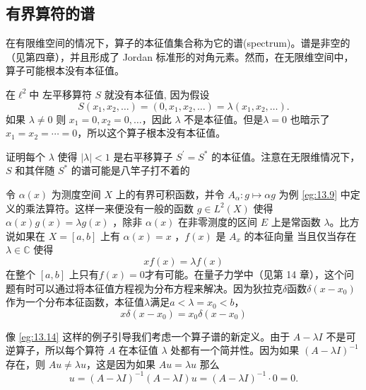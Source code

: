 \subsection{有界算符的谱}
在有限维空间的情况下，算子的本征值集合称为它的谱(spectrum)。谱是非空的（见第四章），并且形成了 Jordan 标准形的对角元素。然而，在无限维空间中，算子可能根本没有本征值。
\begin{eg}
在\(\ell^{2}\)中 左平移算符 \(S\) 就没有本征值, 因为假设
\[
S\left(x_{1}, x_{2}, \ldots\right)=\left(0, x_{1}, x_{2}, \ldots\right)=\lambda\left(x_{1}, x_{2}, \ldots\right) .
\]
如果 \(\lambda \neq 0\) 则 \(x_{1}=0, x_{2}=0, \ldots\)，因此 \(\lambda\) 不是本征值。但是\(\lambda=0\) 也暗示了\(x_{1}=x_{2}=\cdots=0\)，所以这个算子根本没有本征值。
\end{eg}
\begin{exercise}
    证明每个 \(\lambda\) 使得 \(|\lambda|<1\) 是右平移算子 \(S^{\prime}=S^{*}\) 的本征值。注意在无限维情况下，\(S\) 和其伴随 \(S^{*}\) 的谱可能是八竿子打不着的
\end{exercise}
\begin{eg}\label{eg:13.14}
   令 \(\alpha(x)\) 为测度空间 \(X\) 上的有界可积函数，并令 \(A_{\alpha}: g \mapsto \alpha g\) 为例 \ref{eg:13.9} 中定义的乘法算符。这样一来便没有一般的函数 \(g \in L^{2}(X)\) 使得 \(\alpha(x) g(x)=\lambda g(x)\) ，除非 \(\alpha(x) \) 在非零测度的区间 \(E\) 上是常函数 \(\lambda\)。比方说如果在 \(X=[a, b]\) 上有 \(\alpha(x)=x\) ，\(f(x)\) 是 \(A_{x}\) 的本征向量 当且仅当存在 \(\lambda \in \mathbb{C}\) 使得
\[
x f(x)=\lambda f(x)
\]
在整个 \([a, b]\) 上只有\(f(x)=0\)才有可能。在量子力学中（见第 14 章），这个问题有时可以通过将本征值方程视为分布方程来解决。因为狄拉克\(\delta\)函数\(\delta\left(x-x_{0}\right)\)作为一个分布本征函数，本征值\(\lambda\)满足\(a<\lambda=x_{0}<b\)，
\[
x \delta\left(x-x_{0}\right)=x_{0} \delta\left(x-x_{0}\right)
\]
\end{eg}

像 \ref{eg:13.14} 这样的例子引导我们考虑一个算子谱的新定义。由于 \(A-\lambda I\) 不是可逆算子，所以每个算符 \(A\) 在本征值 \(\lambda\) 处都有一个简并性。因为如果 \((A-\lambda I)^{-1}\) 存在，则 \(A u \neq \lambda u\)，这是因为如果 \(A u=\lambda u\) 那么
\[
u=(A-\lambda I)^{-1}(A-\lambda I) u=(A-\lambda I)^{-1}\cdot 0=0 .
\]

